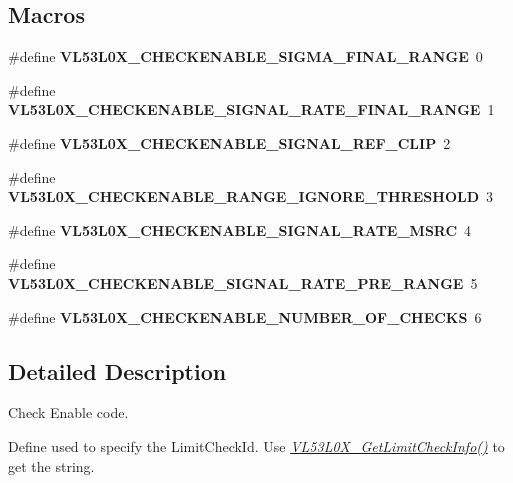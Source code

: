 \subsection*{Macros}
\begin{DoxyCompactItemize}
\item 
\mbox{\label{group__VL53L0X__CheckEnable__group_ga2201b410d5221ebe2a6c151bd32f1cd9}} 
\#define {\bfseries V\+L53\+L0\+X\+\_\+\+C\+H\+E\+C\+K\+E\+N\+A\+B\+L\+E\+\_\+\+S\+I\+G\+M\+A\+\_\+\+F\+I\+N\+A\+L\+\_\+\+R\+A\+N\+GE}~0
\item 
\mbox{\label{group__VL53L0X__CheckEnable__group_ga2cd54f4e61f55a39e6bdb024014dbffd}} 
\#define {\bfseries V\+L53\+L0\+X\+\_\+\+C\+H\+E\+C\+K\+E\+N\+A\+B\+L\+E\+\_\+\+S\+I\+G\+N\+A\+L\+\_\+\+R\+A\+T\+E\+\_\+\+F\+I\+N\+A\+L\+\_\+\+R\+A\+N\+GE}~1
\item 
\mbox{\label{group__VL53L0X__CheckEnable__group_ga3a8bdb391251ba0706c448b147219020}} 
\#define {\bfseries V\+L53\+L0\+X\+\_\+\+C\+H\+E\+C\+K\+E\+N\+A\+B\+L\+E\+\_\+\+S\+I\+G\+N\+A\+L\+\_\+\+R\+E\+F\+\_\+\+C\+L\+IP}~2
\item 
\mbox{\label{group__VL53L0X__CheckEnable__group_ga26fd8247e6738e14fa805c98c96fdbde}} 
\#define {\bfseries V\+L53\+L0\+X\+\_\+\+C\+H\+E\+C\+K\+E\+N\+A\+B\+L\+E\+\_\+\+R\+A\+N\+G\+E\+\_\+\+I\+G\+N\+O\+R\+E\+\_\+\+T\+H\+R\+E\+S\+H\+O\+LD}~3
\item 
\mbox{\label{group__VL53L0X__CheckEnable__group_ga801ff9210173264de83628bcf0993885}} 
\#define {\bfseries V\+L53\+L0\+X\+\_\+\+C\+H\+E\+C\+K\+E\+N\+A\+B\+L\+E\+\_\+\+S\+I\+G\+N\+A\+L\+\_\+\+R\+A\+T\+E\+\_\+\+M\+S\+RC}~4
\item 
\mbox{\label{group__VL53L0X__CheckEnable__group_ga71bd7d9eeb02a86282dff820962e3106}} 
\#define {\bfseries V\+L53\+L0\+X\+\_\+\+C\+H\+E\+C\+K\+E\+N\+A\+B\+L\+E\+\_\+\+S\+I\+G\+N\+A\+L\+\_\+\+R\+A\+T\+E\+\_\+\+P\+R\+E\+\_\+\+R\+A\+N\+GE}~5
\item 
\mbox{\label{group__VL53L0X__CheckEnable__group_ga91e1d823cc96fc1c11e0c9b64247b257}} 
\#define {\bfseries V\+L53\+L0\+X\+\_\+\+C\+H\+E\+C\+K\+E\+N\+A\+B\+L\+E\+\_\+\+N\+U\+M\+B\+E\+R\+\_\+\+O\+F\+\_\+\+C\+H\+E\+C\+KS}~6
\end{DoxyCompactItemize}


\subsection{Detailed Description}
Check Enable code. 

Define used to specify the Limit\+Check\+Id. Use {\itshape \hyperlink{group__VL53L0X__parameters__group_ga4155c6a50a3eaf215d686759022a68f8}{V\+L53\+L0\+X\+\_\+\+Get\+Limit\+Check\+Info()}} to get the string. 